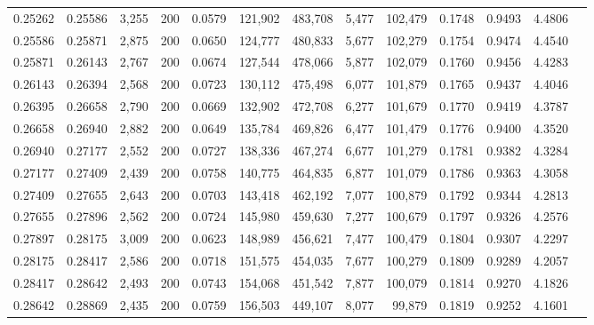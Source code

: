 \begin{tabular}{rrrrrrrrrrrrr}
0.25262 & 0.25586 & 3,255 & 200 &                                     0.0579 & 121,902 & 483,708 &   5,477 & 102,479 & 0.1748 & 0.9493 & 4.4806 \\
0.25586 & 0.25871 & 2,875 & 200 &                                     0.0650 & 124,777 & 480,833 &   5,677 & 102,279 & 0.1754 & 0.9474 & 4.4540 \\
0.25871 & 0.26143 & 2,767 & 200 &                                     0.0674 & 127,544 & 478,066 &   5,877 & 102,079 & 0.1760 & 0.9456 & 4.4283 \\
0.26143 & 0.26394 & 2,568 & 200 &                                     0.0723 & 130,112 & 475,498 &   6,077 & 101,879 & 0.1765 & 0.9437 & 4.4046 \\
0.26395 & 0.26658 & 2,790 & 200 &                                     0.0669 & 132,902 & 472,708 &   6,277 & 101,679 & 0.1770 & 0.9419 & 4.3787 \\
0.26658 & 0.26940 & 2,882 & 200 &                                     0.0649 & 135,784 & 469,826 &   6,477 & 101,479 & 0.1776 & 0.9400 & 4.3520 \\
0.26940 & 0.27177 & 2,552 & 200 &                                     0.0727 & 138,336 & 467,274 &   6,677 & 101,279 & 0.1781 & 0.9382 & 4.3284 \\
0.27177 & 0.27409 & 2,439 & 200 &                                     0.0758 & 140,775 & 464,835 &   6,877 & 101,079 & 0.1786 & 0.9363 & 4.3058 \\
0.27409 & 0.27655 & 2,643 & 200 &                                     0.0703 & 143,418 & 462,192 &   7,077 & 100,879 & 0.1792 & 0.9344 & 4.2813 \\
0.27655 & 0.27896 & 2,562 & 200 &                                     0.0724 & 145,980 & 459,630 &   7,277 & 100,679 & 0.1797 & 0.9326 & 4.2576 \\
0.27897 & 0.28175 & 3,009 & 200 &                                     0.0623 & 148,989 & 456,621 &   7,477 & 100,479 & 0.1804 & 0.9307 & 4.2297 \\
0.28175 & 0.28417 & 2,586 & 200 &                                     0.0718 & 151,575 & 454,035 &   7,677 & 100,279 & 0.1809 & 0.9289 & 4.2057 \\
0.28417 & 0.28642 & 2,493 & 200 &                                     0.0743 & 154,068 & 451,542 &   7,877 & 100,079 & 0.1814 & 0.9270 & 4.1826 \\
0.28642 & 0.28869 & 2,435 & 200 &                                     0.0759 & 156,503 & 449,107 &   8,077 &  99,879 & 0.1819 & 0.9252 & 4.1601 \\

\end{tabular}
